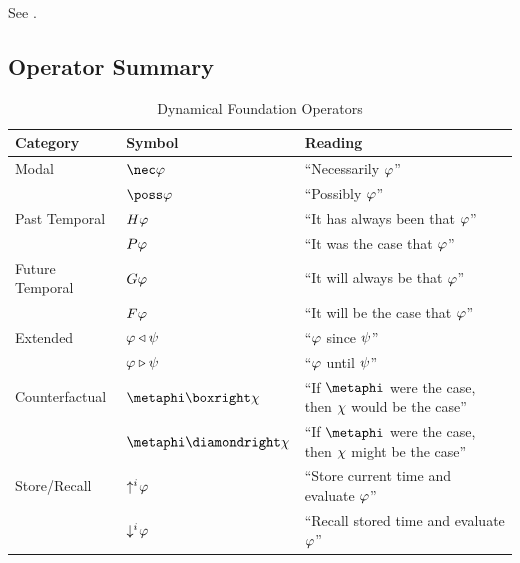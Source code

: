 \documentclass[../LogosReference.tex]{subfiles}
\begin{document}
See .


\subsection{Operator Summary}\label{sec:operator-summary}

\begin{table}[h]
	\centering
	\begin{tabular}{lll}
		\toprule
		\textbf{Category} & \textbf{Symbol}             & \textbf{Reading}                               \\
		\midrule
		Modal             & $\nec\metaA$                & ``Necessarily $\varphi$''                       \\
		                  & $\poss\metaA$               & ``Possibly $\varphi$''                          \\
		\midrule
		Past Temporal     & $H\varphi$             & ``It has always been that $\varphi$''           \\
		                  & $P\varphi$            & ``It was the case that $\varphi$''              \\
		\midrule
		Future Temporal   & $G\varphi$         & ``It will always be that $\varphi$''            \\
		                  & $F\varphi$         & ``It will be the case that $\varphi$''          \\
		\midrule
		Extended          & $\varphi \triangleleft \psi$      & ``$\varphi$ since $\psi$''                    \\
		                  & $\varphi \triangleright \psi$      & ``$\varphi$ until $\psi$''                    \\
		\midrule
		Counterfactual    & $\metaphi \boxright \metaC$ & ``If $\metaphi$ were the case, then $\chi$ would be the case'' \\
		                  & $\metaphi \diamondright \metaC$ & ``If $\metaphi$ were the case, then $\chi$ might be the case'' \\
		\midrule
		Store/Recall      & $\uparrow^{i}\hspace{-2pt}\varphi$           & ``Store current time and evaluate $\varphi$''   \\
		                  & $\downarrow^{i}\hspace{-2pt}\varphi$          & ``Recall stored time and evaluate $\varphi$''   \\
		\bottomrule
	\end{tabular}
	\caption{Dynamical Foundation Operators}
	\label{tab:core-operators}
\end{table}
\end{document}
